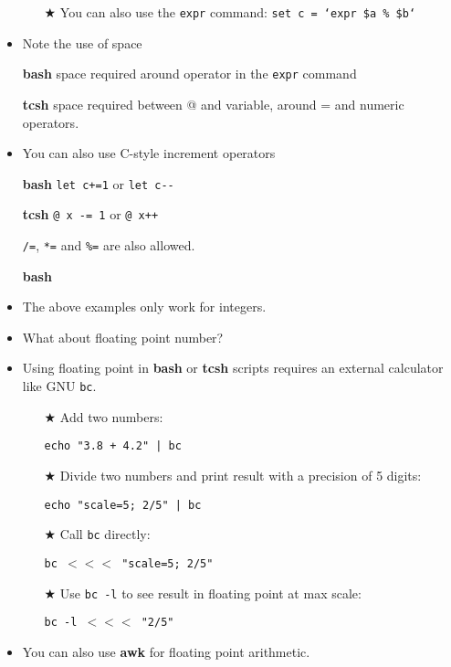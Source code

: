\documentclass[10pt,t]{beamer}
\begin{document}
\begin{frame}
\begin{itemize}
\begin{enumerate}
      \item[$\bigstar$] You can also use the \texttt{expr} command: \texttt{set c = `expr \$a \% \$b`}
    \end{enumerate}
    \item Note the use of space
    \item[\textbf{bash}] space required around operator in the \texttt{expr} command
    \item[\textbf{tcsh}] space required between @ and variable, around = and numeric operators. 
    \item You can also use C-style increment operators
    \item[\textbf{bash}] \texttt{let c+=1} or \texttt{let c-{}-}
    \item[\textbf{tcsh}] \texttt{@ x -= 1} or \texttt{@ x++}
    \item[] \texttt{/=}, \texttt{*=} and \texttt{\%=} are also allowed.
    \item[\textbf{bash}]
    \item The above examples only work for integers.
    \item What about floating point number?
    \framebreak
    \item Using floating point in \textbf{bash} or \textbf{tcsh} scripts requires an external calculator like GNU \texttt{bc}.
    \begin{enumerate}
        \item[$\bigstar$] Add two numbers:
        \item[]\texttt{echo "3.8 + 4.2" | bc}
        \item[$\bigstar$] Divide two numbers and print result with a precision of 5 digits:
        \item[]\texttt{echo "scale=5; 2/5" | bc}
        \item[$\bigstar$] Call \texttt{bc} directly:
        \item[]\texttt{bc $<<<$ "scale=5; 2/5"}
        \item[$\bigstar$] Use \texttt{bc -l} to see result in floating point at max scale:
        \item[] \texttt{bc -l $<<<$ "2/5"}
    \end{enumerate}
    \item You can also use \textbf{awk} for floating point arithmetic. 
  \end{itemize}
\end{frame}
\end{document}

